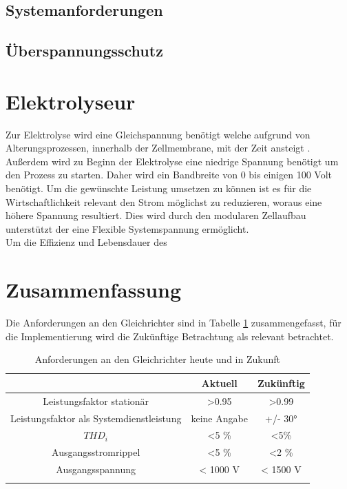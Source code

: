 \subsection{Systemanforderungen}


\subsection{Überspannungsschutz}

\section{Elektrolyseur}
Zur Elektrolyse wird eine Gleichspannung benötigt welche aufgrund von Alterungsprozessen, innerhalb der Zellmembrane, mit der Zeit ansteigt \cite{HydrogenElectronicTopologies}. Außerdem wird zu Beginn der Elektrolyse eine niedrige Spannung benötigt um den Prozess zu starten. Daher wird ein Bandbreite von 0 bis einigen 100 Volt benötigt. Um die gewünschte Leistung umsetzen zu können ist es für die Wirtschaftlichkeit relevant den Strom möglichst zu reduzieren, woraus eine höhere Spannung resultiert. Dies wird durch den modularen Zellaufbau unterstützt der eine Flexible Systemspannung ermöglicht. \\
Um die Effizienz und Lebensdauer des 
\section{Zusammenfassung}
Die Anforderungen an den Gleichrichter sind in Tabelle \ref{tab:AnfZsm} zusammengefasst, für die Implementierung wird die Zukünftige Betrachtung als relevant betrachtet.\\
\begin{table}
\caption{ Anforderungen an den Gleichrichter heute und in Zukunft}

\begin{tabular}{c|c|c}
	
	& Aktuell & Zukünftig \\
	\hline
	Leistungsfaktor stationär & >0.95 & >0.99 \\
		\hline
	Leistungsfaktor als Systemdienstleistung & keine Angabe & +/- 30° \\
	\hline
	$THD_i$ & <5 \% & <5\% \\
	\hline
	Ausgangsstromrippel & <5 \% & <2 \% \\
	\hline
	Ausgangsspannung & < 1000 V & < 1500 V \\
	
	
	\label{tab:AnfZsm}
\end{tabular}
\end{table}
